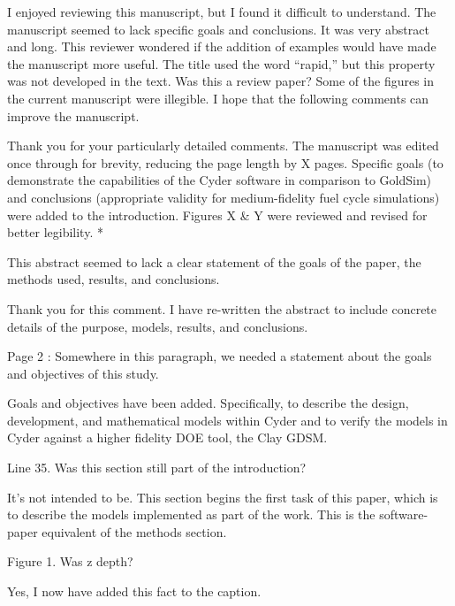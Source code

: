 \documentclass[answers,12pt]{exam}
\begin{document}
\begin{questions}
\question I enjoyed reviewing this manuscript, but I found it difficult to understand.
The manuscript seemed to lack specific goals and conclusions. It was very
abstract and long.  This reviewer wondered if the addition of examples would
have made the manuscript more useful. The title used the word ``rapid,'' but this
property was not developed in the text. Was this a review paper? Some of the
figures in the current manuscript were illegible. I hope that the following
comments can improve the manuscript.
\begin{solution}
Thank you for your particularly detailed comments. The manuscript was edited 
        once through for brevity, reducing the page length by X pages. Specific 
        goals (to demonstrate the capabilities of the Cyder software in 
        comparison to GoldSim) and conclusions (appropriate validity for 
        medium-fidelity fuel cycle simulations) were added to the introduction. 
        Figures X \& Y were reviewed and revised for better legibility.
        {\color{red}*}
\end{solution}

\question This abstract seemed to lack a clear statement of the goals of the paper, the methods used, results, and conclusions.
\begin{solution}
Thank you for this comment. I have re-written the abstract to include concrete 
details of the purpose, models, results, and conclusions. 
\end{solution}

\question Page 2 : Somewhere in this paragraph, we needed a statement about the goals and objectives of this study.
\begin{solution}
Goals and objectives have been added. Specifically, to describe the design, 
        development, and mathematical models within Cyder and to verify the 
        models in Cyder against a higher fidelity DOE tool, the Clay GDSM.
\end{solution}


\question Line 35. Was this section still part of the introduction?

\begin{solution}
It's not intended to be. This section begins the first task of this paper, which is to describe the 
models implemented as part of the work. This is the software-paper equivalent 
        of the methods section.
\end{solution}

\question Figure 1. Was z depth?
\begin{solution}
Yes, I now have added this fact to the caption.
\end{solution}


\end{questions}
\end{document}
